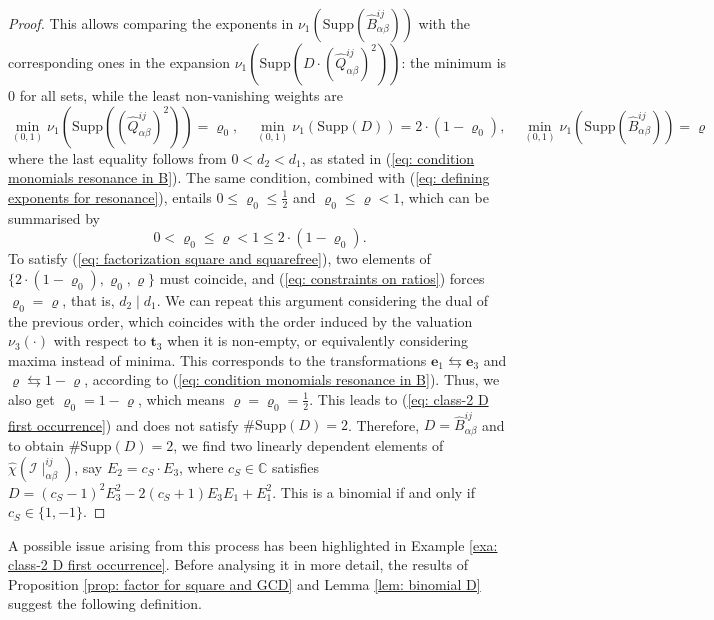 \documentclass[10pt]{article}
\theoremstyle{remark}%
\theoremstyle{definition}%
\begin{document}
\begin{proof}
This allows comparing the exponents in $\nu_{1}(\mathrm{Supp}(\hat{B}_{\alpha\beta}^{ij}))$ with the corresponding ones in the expansion
$\nu_{1}(\mathrm{Supp}(D\cdot(\hat{Q}_{\alpha\beta}^{ij})^{2}))$: the minimum is $0$ for all sets, while the least non-vanishing weights are
\begin{equation*}
\min_{(0,1)}\nu_{1}(\mathrm{Supp}((\hat{Q}_{\alpha\beta}^{ij})^{2})) = \varrho_{0}, \quad 
\min_{(0,1)}\nu_{1}(\mathrm{Supp}(D)) =  2\cdot(1-\varrho_{0}), \quad 
\min_{(0,1)} \nu_{1}(\mathrm{Supp}(\hat{B}_{\alpha\beta}^{ij})) = \varrho
\end{equation*}
where the last equality follows from $0<d_{2}<d_{1}$, as stated in (\ref{eq: condition monomials resonance in B}). The same condition, combined with (\ref{eq: defining exponents for resonance}), entails $ 0\leq\varrho_{0}\leq \frac{1}{2}$ and $\varrho_{0}\leq \varrho < 1$, which can be summarised by
 \begin{equation}
   0 < \varrho_{0} \leq \varrho < 1\leq 2\cdot (1-\varrho_{0}).
   \label{eq: constraints on ratios}
 \end{equation} 
To satisfy (\ref{eq: factorization square and squarefree}), two elements of $\{2\cdot(1-\varrho_{0}),\varrho_{0},\varrho\}$ must coincide, and (\ref{eq: constraints on ratios}) forces $\varrho_{0}=\varrho$, that is, $d_{2}\mid d_{1}$. We can repeat this argument considering the dual of the previous order, which coincides with the order induced by the valuation $\nu_{3}(\cdot)$ with respect to $\mathbf{t}_{3}$ when it is non-empty, or equivalently considering maxima instead of minima. This corresponds to the transformations $\mathbf{e}_{1}\leftrightarrows\mathbf{e}_{3}$ and $\varrho\leftrightarrows1-\varrho$, according to (\ref{eq: condition monomials resonance in B}). Thus, we also get $\varrho_{0}=1-\varrho$, which means $\varrho=\varrho_{0}=\frac{1}{2}$. This leads to (\ref{eq: class-2 D first occurrence}) and does not satisfy $\#\mathrm{Supp}(D)=2$. Therefore, $D=\hat{B}_{\alpha\beta}^{ij}$ and to obtain $\#\mathrm{Supp}(D)=2$, we find two linearly dependent elements of $\hat{\chi}(\mathcal{I}\mid_{\alpha\beta}^{ij})$, say $E_{2}=c_{S}\cdot E_{3}$, where $c_{S}\in\mathbb{C}$ satisfies $D=(c_{S}-1)^{2}E_{3}^{2}-2(c_{S}+1)E_{3}E_{1}+E_{1}^{2}$. This is a binomial if and only if $c_{S}\in\{1,-1\}$. 
\end{proof}
A possible issue arising from this process has been highlighted in
Example \ref{exa: class-2 D first occurrence}. Before analysing it in more detail, the results of Proposition \ref{prop: factor for square and GCD} and Lemma \ref{lem: binomial D} suggest the following definition. 
\end{document}

